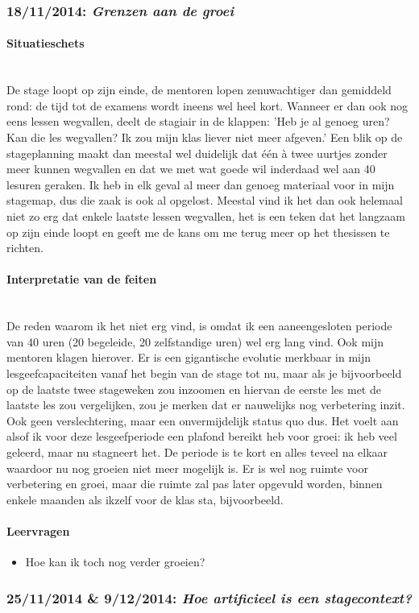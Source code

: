 \documentclass[a4paper,11pt]{article}
\newcommand{\tussen}[1]{\paragraph*{#1}\mbox{}\\}
\theoremstyle{definition}
\begin{document}
\subsubsection{18/11/2014: \emph{Grenzen aan de groei}}
\tussen{Situatieschets}
De stage loopt op zijn einde, de mentoren lopen zenuwachtiger dan gemiddeld 
rond: de tijd tot de examens wordt ineens wel heel kort. Wanneer er dan ook nog 
eens lessen wegvallen, deelt de stagiair in de klappen: 'Heb je al genoeg uren? 
Kan die les wegvallen? Ik zou mijn klas liever niet meer afgeven.' Een blik op de stageplanning maakt dan meestal
wel duidelijk dat één à twee uurtjes zonder meer kunnen wegvallen en dat we met wat goede wil inderdaad
wel aan 40 lesuren geraken. Ik heb in elk geval al meer dan genoeg materiaal voor in mijn 
stagemap, dus die zaak is ook al opgelost. Meestal vind ik het dan ook helemaal niet zo erg
dat enkele laatste lessen wegvallen, het is een teken dat het langzaam op zijn 
einde loopt en geeft me de kans om me terug meer op het thesissen te richten.

\tussen{Interpretatie van de feiten}
De reden waarom ik het niet erg vind, is omdat ik een aaneengesloten periode van 
40 uren (20 begeleide, 20 zelfstandige uren) wel erg lang vind. Ook mijn mentoren klagen hierover. Er is een 
gigantische evolutie merkbaar in mijn lesgeefcapaciteiten vanaf het begin van de stage tot nu, maar als je 
bijvoorbeeld op de laatste twee stageweken zou inzoomen en hiervan de eerste les 
met de laatste les zou vergelijken, zou je merken dat er nauwelijks nog verbetering 
inzit. Ook geen verslechtering, maar een onvermijdelijk status quo dus. Het voelt aan alsof ik voor deze 
lesgeefperiode een plafond bereikt heb voor groei: ik heb veel geleerd, maar nu 
stagneert het. De periode is te kort en alles teveel na elkaar waardoor nu nog 
groeien niet meer mogelijk is. Er is wel nog ruimte voor verbetering en groei, 
maar die ruimte zal pas later opgevuld worden, binnen enkele maanden als ikzelf 
voor de klas sta, bijvoorbeeld.
\paragraph*{Leervragen}
\begin{itemize}
  \item Hoe kan ik toch nog verder groeien?  
  \end{itemize}
   
 
   
\subsubsection{25/11/2014 \& 9/12/2014: \emph{Hoe artificieel is een stagecontext?}}
\end{document}
